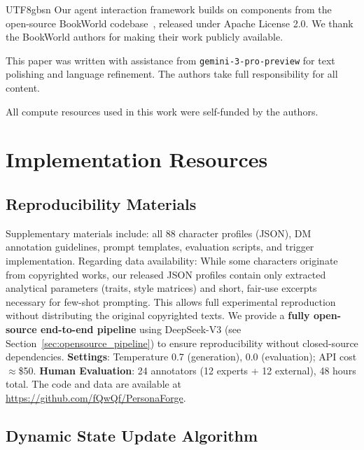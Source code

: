 \documentclass[11pt]{article}
\begin{document}
\begin{CJK*}{UTF8}{gbsn}
Our agent interaction framework builds on components from the open-source BookWorld codebase~\citep{ran2025bookworld}, released under Apache License 2.0. We thank the BookWorld authors for making their work publicly available.

This paper was written with assistance from \texttt{gemini-3-pro-preview} for text polishing and language refinement. The authors take full responsibility for all content.

All compute resources used in this work were self-funded by the authors.



\appendix

\section{Implementation Resources}
\label{sec:impl_resources}

\subsection{Reproducibility Materials}
\label{sec:reproducibility}

Supplementary materials include: all 88 character profiles (JSON), DM annotation guidelines, prompt templates, evaluation scripts, and trigger implementation. Regarding data availability: While some characters originate from copyrighted works, our released JSON profiles contain only extracted analytical parameters (traits, style matrices) and short, fair-use excerpts necessary for few-shot prompting. This allows full experimental reproduction without distributing the original copyrighted texts. We provide a \textbf{fully open-source end-to-end pipeline} using DeepSeek-V3 (see Section~\ref{sec:opensource_pipeline}) to ensure reproducibility without closed-source dependencies. \textbf{Settings}: Temperature 0.7 (generation), 0.0 (evaluation); API cost $\approx$\$50. \textbf{Human Evaluation}: 24 annotators (12 experts + 12 external), 48 hours total. The code and data are available at \url{https://github.com/fQwQf/PersonaForge}.

\subsection{Dynamic State Update Algorithm}
\label{sec:algorithm}


\end{CJK*}
\end{document}
